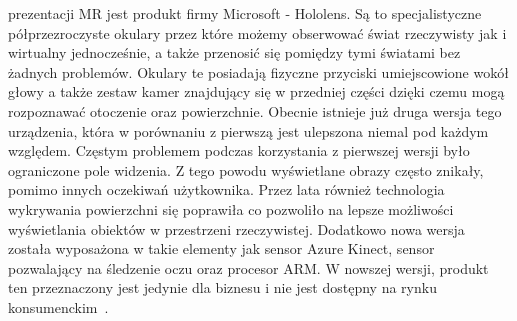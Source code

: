 prezentacji MR jest produkt firmy Microsoft - Hololens. Są to specjalistyczne półprzezroczyste okulary przez które możemy obserwować świat rzeczywisty jak i wirtualny jednocześnie, a także przenosić się pomiędzy tymi światami bez żadnych problemów. Okulary te posiadają fizyczne przyciski umiejscowione wokół głowy a także zestaw kamer znajdujący się w przedniej części dzięki czemu mogą rozpoznawać otoczenie oraz powierzchnie. Obecnie istnieje już druga wersja tego urządzenia, która w porównaniu z pierwszą jest ulepszona niemal pod każdym względem. Częstym problemem podczas korzystania z pierwszej wersji było ograniczone pole widzenia. Z tego powodu wyświetlane obrazy często znikały, pomimo innych oczekiwań użytkownika. Przez lata również technologia wykrywania powierzchni się poprawiła co pozwoliło na lepsze możliwości wyświetlania obiektów w przestrzeni rzeczywistej. Dodatkowo nowa wersja została wyposażona w takie elementy jak sensor Azure Kinect, sensor pozwalający na śledzenie oczu oraz procesor ARM. W nowszej wersji, produkt ten przeznaczony jest jedynie dla biznesu i nie jest dostępny na rynku konsumenckim~\cite{holo}.
	 
  
